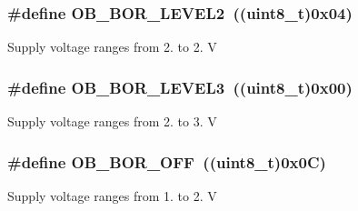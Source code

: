 \subsubsection[{O\+B\+\_\+\+B\+O\+R\+\_\+\+L\+E\+V\+E\+L2}]{\setlength{\rightskip}{0pt plus 5cm}\#define O\+B\+\_\+\+B\+O\+R\+\_\+\+L\+E\+V\+E\+L2~((uint8\+\_\+t)0x04)}\label{group___f_l_a_s_h___b_o_r___reset___level_gad678e849fcf817f6ed2d837538e8ebc2}
Supply voltage ranges from 2. to 2. V \hypertarget{group___f_l_a_s_h___b_o_r___reset___level_ga3132b8202c0a345e9dd33d136714b046}{}
\subsubsection[{O\+B\+\_\+\+B\+O\+R\+\_\+\+L\+E\+V\+E\+L3}]{\setlength{\rightskip}{0pt plus 5cm}\#define O\+B\+\_\+\+B\+O\+R\+\_\+\+L\+E\+V\+E\+L3~((uint8\+\_\+t)0x00)}\label{group___f_l_a_s_h___b_o_r___reset___level_ga3132b8202c0a345e9dd33d136714b046}
Supply voltage ranges from 2. to 3. V \hypertarget{group___f_l_a_s_h___b_o_r___reset___level_gaabc231cb1d05a94fe860f67bb5a37b12}{}
\subsubsection[{O\+B\+\_\+\+B\+O\+R\+\_\+\+O\+F\+F}]{\setlength{\rightskip}{0pt plus 5cm}\#define O\+B\+\_\+\+B\+O\+R\+\_\+\+O\+F\+F~((uint8\+\_\+t)0x0\+C)}\label{group___f_l_a_s_h___b_o_r___reset___level_gaabc231cb1d05a94fe860f67bb5a37b12}
Supply voltage ranges from 1. to 2. V 